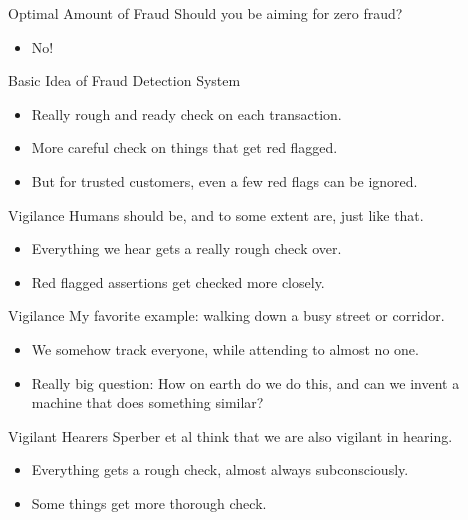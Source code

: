 \documentclass[
  17pt,
  letterpaper,
  ignorenonframetext,
  aspectratio=169,
]{beamer}
\providecommand{\tightlist}{%
  \setlength{\itemsep}{0pt}\setlength{\parskip}{0pt}}\usepackage{longtable,booktabs,array}
\begin{document}
\begin{frame}{Optimal Amount of Fraud}
\protect\hypertarget{optimal-amount-of-fraud}{}
Should you be aiming for zero fraud?

\begin{itemize}[<+->]
\tightlist
\item
  No!
\end{itemize}
\end{frame}

\begin{frame}{Basic Idea of Fraud Detection System}
\protect\hypertarget{basic-idea-of-fraud-detection-system}{}
\begin{itemize}[<+->]
\tightlist
\item
  Really rough and ready check on each transaction.
\item
  More careful check on things that get red flagged.
\item
  But for trusted customers, even a few red flags can be ignored.
\end{itemize}
\end{frame}

\begin{frame}{Vigilance}
\protect\hypertarget{vigilance}{}
Humans should be, and to some extent are, just like that.

\begin{itemize}[<+->]
\tightlist
\item
  Everything we hear gets a really rough check over.
\item
  Red flagged assertions get checked more closely.
\end{itemize}
\end{frame}

\begin{frame}{Vigilance}
\protect\hypertarget{vigilance-1}{}
My favorite example: walking down a busy street or corridor.

\begin{itemize}[<+->]
\tightlist
\item
  We somehow track everyone, while attending to almost no one.
\item
  Really big question: How on earth do we do this, and can we invent a
  machine that does something similar?
\end{itemize}
\end{frame}

\begin{frame}{Vigilant Hearers}
\protect\hypertarget{vigilant-hearers}{}
Sperber et al think that we are also vigilant in hearing.

\begin{itemize}[<+->]
\tightlist
\item
  Everything gets a rough check, almost always subconsciously.
\item
  Some things get more thorough check.
\end{itemize}
\end{frame}
\end{document}
